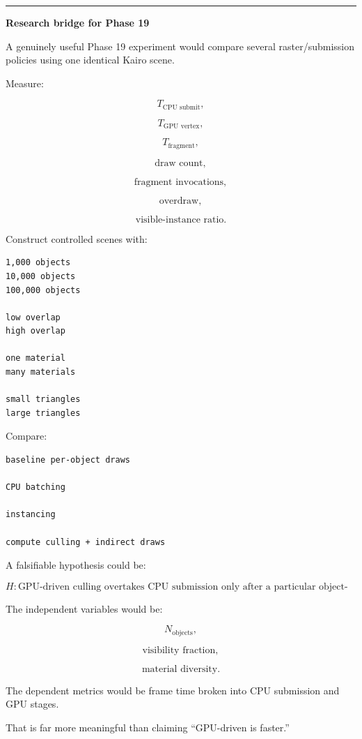 \begin{center}\rule{0.5\linewidth}{0.5pt}\end{center}

\textbf{Research bridge for Phase 19}

A genuinely useful Phase 19 experiment would compare several raster/submission policies using one identical Kairo scene.

Measure:

\[
T_{\text{CPU submit}},
\]

\[
T_{\text{GPU vertex}},
\]

\[
T_{\text{fragment}},
\]

\[
\text{draw count},
\]

\[
\text{fragment invocations},
\]

\[
\text{overdraw},
\]

\[
\text{visible-instance ratio}.
\]

Construct controlled scenes with:

\begin{verbatim}
1,000 objects
10,000 objects
100,000 objects

low overlap
high overlap

one material
many materials

small triangles
large triangles
\end{verbatim}

Compare:

\begin{verbatim}
baseline per-object draws

CPU batching

instancing

compute culling + indirect draws
\end{verbatim}

A falsifiable hypothesis could be:

\[
H:
\text{GPU-driven culling overtakes CPU submission only after a particular object-count/visibility threshold.}
\]

The independent variables would be:

\[
N_{\text{objects}},
\]

\[
\text{visibility fraction},
\]

\[
\text{material diversity}.
\]

The dependent metrics would be frame time broken into CPU submission and GPU stages.

That is far more meaningful than claiming ``GPU-driven is faster.''

